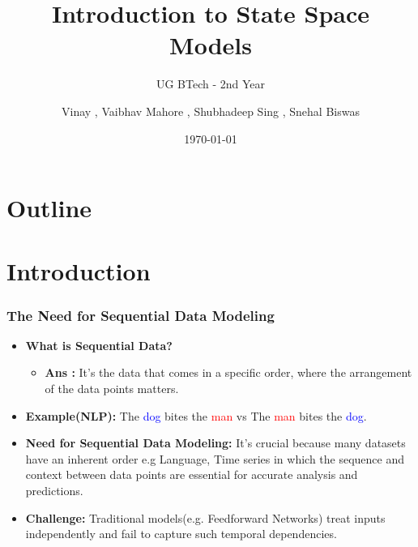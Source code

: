 \documentclass{beamer}
\title{Introduction to State Space Models}
\subtitle{UG BTech - 2nd Year}
\author{Vinay , Vaibhav Mahore , Shubhadeep Sing , Snehal Biswas}
\institute{Indian Institute of Science, Bangalore}
\date{\today}
\begin{document}
\frame{\titlepage}

\section{Outline}




\section{Introduction}

\begin{frame}
\frametitle{The Need for Sequential Data Modeling}
\begin{itemize}
    \item \textbf{What is Sequential Data?}   \\
    \begin{itemize}
        \item \textbf{Ans :} It's the  data that comes in a specific order, where the arrangement of the data points matters.
    \end{itemize}
    \item \textbf{Example(NLP):}  
    The \textcolor{blue}{dog} bites the \textcolor{red}{man} vs The \textcolor{red}{man} bites the \textcolor{blue}{dog}.
    \item \textbf{Need for Sequential Data Modeling:}
    It's crucial because many datasets have an inherent order e.g Language, Time series in which the sequence and context between data points are essential for accurate analysis and predictions.
    \item \textbf{Challenge:}  
    Traditional models(e.g. Feedforward Networks) treat inputs independently and fail to capture such temporal dependencies.
\end{itemize}
\end{frame}
\end{document}

